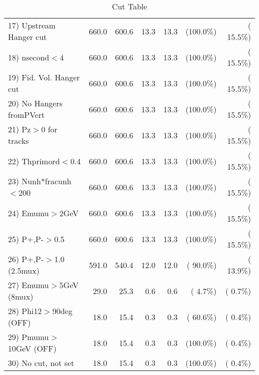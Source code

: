 \begin{table}[h!]
\begin{tabular}{||l||r|r|r|r|r|r||}
 17) Upstream Hanger cut  &        660.0 &        600.6 &         13.3 &         13.3 & (100.0\%) & ( 15.5\%) \\
 18) nsecond$<$4          &        660.0 &        600.6 &         13.3 &         13.3 & (100.0\%) & ( 15.5\%) \\
 19) Fid. Vol. Hanger cut &        660.0 &        600.6 &         13.3 &         13.3 & (100.0\%) & ( 15.5\%) \\
 20) No Hangers fromPVert &        660.0 &        600.6 &         13.3 &         13.3 & (100.0\%) & ( 15.5\%) \\
 21) Pz$>$0 for tracks    &        660.0 &        600.6 &         13.3 &         13.3 & (100.0\%) & ( 15.5\%) \\
 22) Thprimord$<$0.4      &        660.0 &        600.6 &         13.3 &         13.3 & (100.0\%) & ( 15.5\%) \\
 23) Nunh*fracunh$<$200   &        660.0 &        600.6 &         13.3 &         13.3 & (100.0\%) & ( 15.5\%) \\
 24) Emumu$>$2GeV         &        660.0 &        600.6 &         13.3 &         13.3 & (100.0\%) & ( 15.5\%) \\
 25) P+,P-$>$0.5          &        660.0 &        600.6 &         13.3 &         13.3 & (100.0\%) & ( 15.5\%) \\
 26) P+,P-$>$1.0 (2.5mux) &        591.0 &        540.4 &         12.0 &         12.0 & ( 90.0\%) & ( 13.9\%) \\
 27) Emumu$>$5GeV  (8mux) &         29.0 &         25.3 &          0.6 &          0.6 & (  4.7\%) & (  0.7\%) \\
 28) Phi12$>$90deg  (OFF) &         18.0 &         15.4 &          0.3 &          0.3 & ( 60.6\%) & (  0.4\%) \\
 29) Pmumu$>$10GeV  (OFF) &         18.0 &         15.4 &          0.3 &          0.3 & (100.0\%) & (  0.4\%) \\
 30) No cut, not set      &         18.0 &         15.4 &          0.3 &          0.3 & (100.0\%) & (  0.4\%) \\
 \hline
 \hline
 \end{tabular}
 \caption{Cut Table           }
 \label{tab-cutheavy_neutrino_1.000}
 \end{table}
